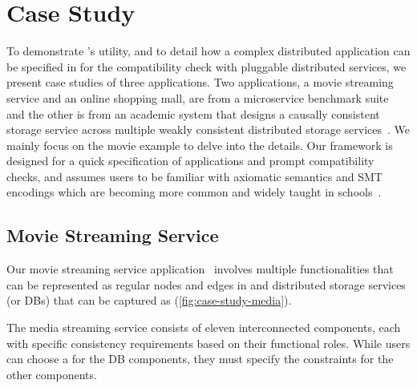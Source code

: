 \section{Case Study}
\label{sec:cs}

To demonstrate \sysname{}'s utility, and to detail how a complex distributed
application can be specified in \sysname{} for the compatibility check with
pluggable distributed services, we present case studies of three applications.
Two applications, a movie streaming service and an online shopping
mall, are from
a microservice benchmark suite~\cite{gan2019an} and the other is from an
academic system that designs a causally consistent storage service
across multiple weakly consistent distributed storage services~\cite{boltoncc}.
We mainly focus on the movie example to delve into the details.
Our framework is designed for a quick specification of applications
and prompt compatibility checks, and assumes users to be familiar with
axiomatic semantics and SMT encodings which are becoming more common and 
widely taught in schools~\cite{fmedu1, fmedu2, fmedu3, fmedu4}.

\subsection{Movie Streaming Service}


Our movie streaming service application~\cite{gan2019an} involves
multiple functionalities that can be represented as
regular nodes and edges in \sysgraph{} and distributed storage services (or DBs)
that can be captured as \sysmods{} (\cref{fig:case-study-media}).

The media streaming service consists of eleven interconnected
components, each with specific consistency requirements based on
their functional roles. While users can choose a \sysmod{} for the
DB components, they must specify the constraints for the other components.

